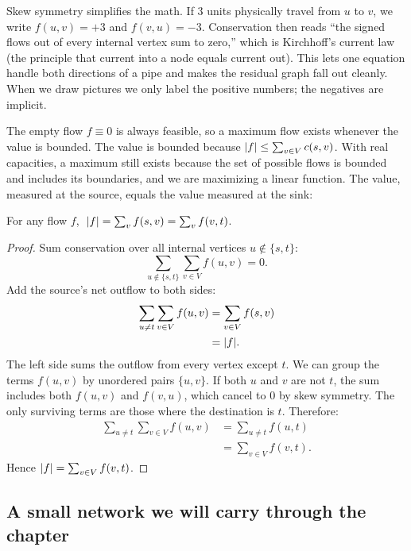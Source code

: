 \begin{intuitionbox}
Skew symmetry simplifies the math. If $3$ units physically
travel from $u$ to $v$, we write $f(u,v)=+3$ and $f(v,u)=-3$. Conservation then
reads ``the signed flows out of every internal vertex sum to zero,'' which is
Kirchhoff's current law (the principle that current into a node equals current out).
This lets one equation handle both
directions of a pipe and makes the residual graph fall out cleanly. When
we draw pictures we only label the positive numbers; the negatives are implicit.
\end{intuitionbox}

The empty flow $f\equiv 0$ is always feasible, so a maximum
flow exists whenever the value is bounded. The value is bounded because
$\lvert f\rvert\le \sum_{v\in V} c(s,v)$. With real capacities, a maximum still exists because the set of possible flows is bounded and includes its boundaries, and we are maximizing a linear function. The value, measured at the
source, equals the value measured at the sink:

\begin{lemma}
\label{ch12:lem-value-sink}
For any flow $f$, $\;\lvert f\rvert=\sum_{v} f(s,v)=\sum_v f(v,t)$.
\end{lemma}

\begin{proof}
Sum conservation over all internal vertices $u\notin\{s,t\}$:
\[
  \sum_{u\notin \{s,t\}}\sum_{v\in V} f(u,v) = 0.
\]
Add the source's net outflow to both sides:
\begin{align*}
  \sum_{u\neq t}\sum_{v\in V} f(u,v) &= \sum_{v\in V} f(s,v) \\
  &= \lvert f\rvert.
\end{align*}
The left side sums the outflow from every vertex except $t$. We can group the terms $f(u,v)$ by unordered pairs $\{u,v\}$. If both $u$ and $v$ are not $t$, the sum includes both $f(u,v)$ and $f(v,u)$, which cancel to $0$ by skew symmetry. The only surviving terms are those where the destination is $t$. Therefore:
\begin{align*}
  \sum_{u\neq t}\sum_{v\in V} f(u,v) &= \sum_{u\neq t} f(u,t) \\
  &= \sum_{v\in V} f(v,t).
\end{align*}
Hence $\lvert f\rvert=\sum_{v\in V} f(v,t)$.
\end{proof}

\subsection{A small network we will carry through the chapter}

